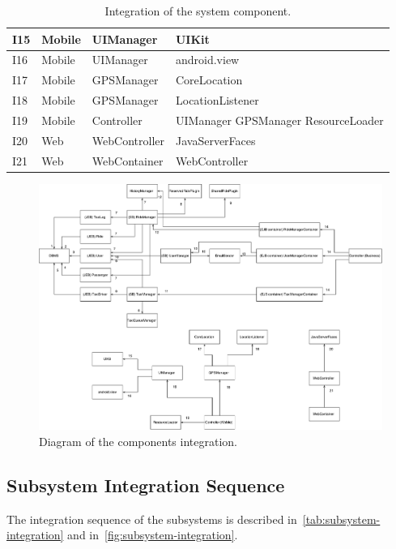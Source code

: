 \begin{table}
\begin{small}
\begin{tabular}{| l | l | p{} | p{} |}
    I15  & Mobile & UIManager & UIKit\\
    \hline
    I16  & Mobile & UIManager & android.view\\
    \hline
    I17  & Mobile & GPSManager & CoreLocation\\
    \hline
    I18  & Mobile & GPSManager & LocationListener\\
    \hline
    I19  & Mobile & Controller & UIManager \newline GPSManager \newline ResourceLoader\\
    \hline
    I20  & Web & WebController & JavaServerFaces\\
    \hline
    I21 & Web & WebContainer & WebController\\
    \hline
    \end{tabular}
    \end{small}
    \caption{Integration of the system component.}
    \label{tab:components-integration}
\end{table}

\begin{figure}
    \centering
    \includegraphics[width=\textwidth]{figures/components_integration.pdf}
    \caption{Diagram of the components integration.}
    \label{fig:components-integration}
\end{figure}

\subsection{Subsystem Integration Sequence}
The integration sequence of the subsystems is described in~\autoref{tab:subsystem-integration} and in~\autoref{fig:subsystem-integration}.

